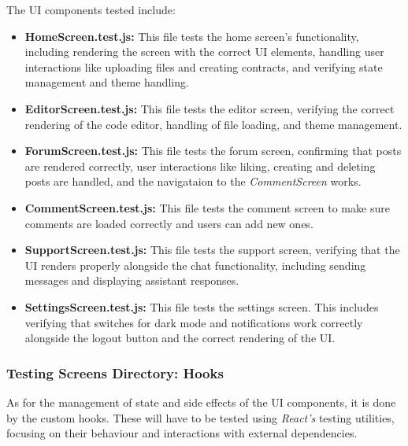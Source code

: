 The UI components tested include:

\begin{itemize}
    \item \textbf{HomeScreen.test.js:} This file tests the home screen's functionality, including rendering the screen with the correct UI elements, handling user interactions like uploading files and creating contracts, and verifying state management and theme handling.
    \item \textbf{EditorScreen.test.js:} This file tests the editor screen, verifying the correct rendering of the code editor, handling of file loading, and theme management.
    \item \textbf{ForumScreen.test.js:} This file tests the forum screen, confirming that posts are rendered correctly, user interactions like liking, creating and deleting posts are handled, and the navigataion to the \textit{CommentScreen} works.
    \item \textbf{CommentScreen.test.js:} This file tests the comment screen to make sure comments are loaded correctly and users can add new ones.
    \item \textbf{SupportScreen.test.js:} This file tests the support screen, verifying that the UI renders properly alongside the chat functionality, including sending messages and displaying assistant responses.
    \item \textbf{SettingsScreen.test.js:} This file tests the settings screen. This includes verifying that switches for dark mode and notifications work correctly alongside the logout button and the correct rendering of the UI.
\end{itemize}

\subsubsection{Testing Screens Directory: Hooks}

As for the management of state and side effects of the UI components, it is done by the custom hooks. These will have to be tested using \textit{React's} testing utilities, focusing on their behaviour and interactions with external dependencies.

